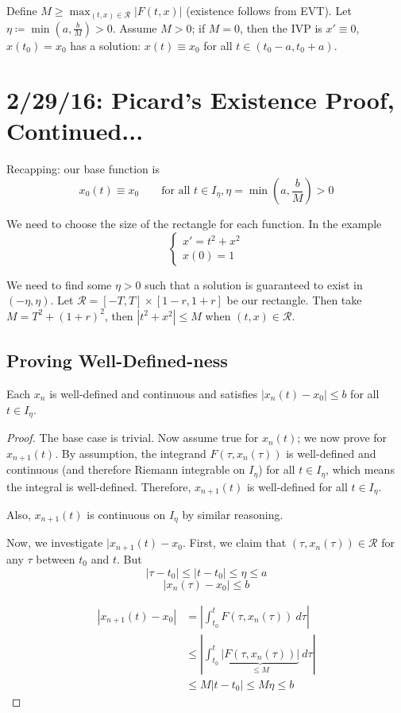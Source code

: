 \documentclass[12pt]{article}
\begin{document}
Define $M \ge \displaystyle\max_{(t,x) \in \mathcal{R}}|F(t,x)|$ (existence follows from EVT). Let $\eta \coloneqq \min(a,\frac{b}{M}) > 0$. Assume $M>0$; if $M=0$, then the IVP is $x' \equiv 0$, $x(t_0) = x_0$ has a solution: $x(t) \equiv x_0$ for all $t \in (t_0 - a,t_0 + a)$.

\section{2/29/16: Picard's Existence Proof, Continued...}
Recapping: our base function is \[ x_0(t) \equiv x_0 \qquad \text{for all } t \in I_{\eta}, \eta = \min\left(a,\frac{b}{M}\right) >0 \]

We need to choose the size of the rectangle for each function. In the example 
\[
\begin{cases}
x' = t^2 + x^2 \\
x(0) = 1
\end{cases}
\]

We need to find some $\eta > 0$ such that a solution is guaranteed to exist in $(-\eta,\eta)$. Let $\mathcal{R} = [-T,T] \times [1-r,1+r]$ be our rectangle. Then take $M = T^2 + (1+r)^2$, then $|t^2 + x^2| \le M$ when $(t,x) \in \mathcal{R}$.

\subsection{Proving Well-Defined-ness}
\begin{theorem}
Each $x_n$ is well-defined and continuous and satisfies $|x_n(t) - x_0| \le b$ for all $t \in I_{\eta}$.
\end{theorem}
\begin{proof}
The base case is trivial. Now assume true for $x_n(t)$; we now prove for $x_{n+1}(t)$. By assumption, the integrand $F(\tau,x_n(\tau))$ is well-defined and continuous (and therefore Riemann integrable on $I_{\eta}$) for all $t \in I_{\eta}$, which means the integral is well-defined. Therefore, $x_{n+1}(t)$ is well-defined for all $t \in I_{\eta}$.

Also, $x_{n+1}(t)$ is continuous on $I_{\eta}$ by similar reasoning. 

Now, we investigate $|x_{n+1}(t) - x_0$. First, we claim that $(\tau, x_n(\tau)) \in \mathcal{R}$ for any $\tau$ between $t_0$ and $t$. But \[ |\tau - t_0| \le |t-t_0| \le \eta \le a\]
\[ |x_n(\tau) - x_0| \le b \]

\[
\begin{aligned}
|x_{n+1}(t) - x_0| &= \left|\int_{t_0}^tF(\tau,x_n(\tau)) \ d\tau \right| \\
&\le \left|\int_{t_0}^t\underbrace{|F(\tau,x_n(\tau))|}_{\le M} \ d\tau \right| \\
&\le M|t-t_0| \le M\eta \le b
\end{aligned}
\]

\end{proof}
\end{document}
